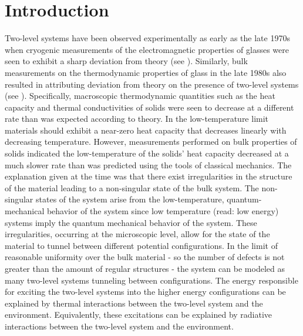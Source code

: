 \documentclass[aps,prl,reprint,groupedaddress]{revtex4-1}
\begin{document}
\maketitle

\section{Introduction}
Two-level systems have been observed experimentally as early as the late 1970s when cryogenic measurements of the electromagnetic properties of glasses were seen to exhibit a sharp deviation from theory (see \cite{von_schickfus_saturation_1977}). Similarly, bulk measurements on the thermodynamic properties of glass in the late 1980s also resulted in attributing deviation from theory on the presence of two-level systems (see \cite{phillips_two-level_1987}). Specifically, macroscopic thermodynamic quantities such as the heat capacity and thermal conductivities of solids were seen to decrease at a different rate than was expected according to theory. In the low-temperature limit materials should exhibit a near-zero heat capacity that decreases linearly with decreasing temperature. However, measurements performed on bulk properties of solids indicated the low-temperature of the solids' heat capacity decreased at a much slower rate than was predicted using the tools of classical mechanics. The explanation given at the time was that there exist irregularities in the structure of the material leading to a non-singular state of the bulk system. The non-singular states of the system arise from the low-temperature, quantum-mechanical behavior of the system since low temperature (read: low energy) systems imply the quantum mechanical behavior of the system. These irregularities, occurring at the microscopic level, allow for the state of the material to tunnel between different potential configurations. In the limit of reasonable uniformity over the bulk material - so the number of defects is not greater than the amount of regular structures - the system can be modeled as many two-level systems tunneling between configurations. The energy responsible for exciting the two-level systems into the higher energy configurations can be explained by thermal interactions between the two-level system and the environment. Equivalently, these excitations can be explained by radiative interactions between the two-level system and the environment. 
\end{document}
